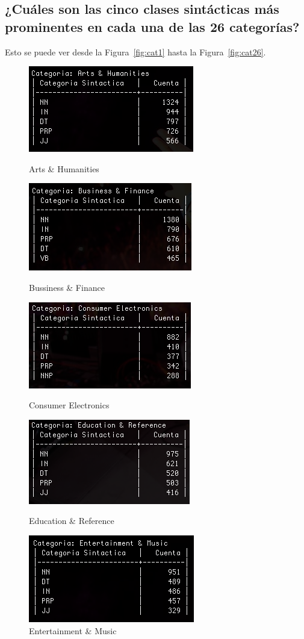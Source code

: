 \documentclass{article}
\begin{document}
\newpage
\subsection{¿Cuáles son las cinco clases sintácticas más prominentes en cada una de las 26 categorías?} 
Esto se puede ver desde la Figura~\ref{fig:cat1} hasta la Figura~\ref{fig:cat26}.
\begin{figure}[h!]
\centering
\includegraphics[scale=0.5]{figuras/cat1.png}
\caption{Arts \& Humanities}
\label{fig:cat1}
\includegraphics[scale=0.5]{figuras/cat2.png}
\caption{Bussiness \& Finance}
\label{fig:cat2}
\includegraphics[scale=0.5]{figuras/cat3.png}
\caption{Consumer Electronics}
\label{fig:cat3}
\includegraphics[scale=0.5]{figuras/cat4.png}
\caption{Education \& Reference}
\label{fig:cat4}
\includegraphics[scale=0.5]{figuras/cat5.png}
\caption{Entertainment \& Music}
\label{fig:cat5}
\end{figure}
\end{document}
